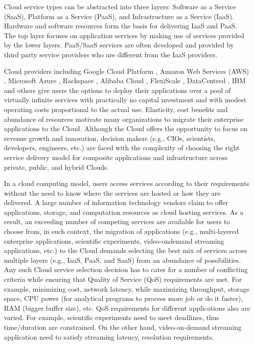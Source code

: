 Cloud service types can be abstracted into three layers: Software as
a Service (SaaS), Platform as a Service (PaaS), and
Infrastructure as a Service (IaaS). Hardware and software
resources form the basis for delivering IaaS and PaaS. The
top layer focuses on application services by making
use of services provided by the lower layers. PaaS/SaaS
services are often developed and provided by third party
service providers who are different from the IaaS providers.

Cloud providers including Google Cloud Platform \cite{google_cloud},
Amazon Web Services (AWS) \cite{aws}, Microsoft Azure \cite{azure}, 
Rackspace \cite{Rackspace},
Alibaba Cloud \cite{Alibaba}, FlexiScale \cite{FlexiScale}, 
DataCentred \cite{DataCentred}, IBM \cite{IBMSoftLayer} and others
give users the options to deploy their applications over a pool
of virtually infinite services with practically no capital
investment and with modest operating costs proportional to
the actual use. Elasticity, cost benefits and abundance of
resources motivate many organizations to migrate their
enterprise applications to the Cloud. Although the Cloud offers
the opportunity to focus on revenue growth and innovation,
decision makers (e.g., CIOs, scientists, developers,
engineers, etc.) are faced with the complexity of choosing
the right service delivery model for composite applications
and infrastructure across private, public, and hybrid Clouds.

In a cloud computing model, users access services according
to their requirements without the need to know where the
services are hosted or how they are delivered. 
A large number of information technology vendors claim to offer applications, storage,
and computation resources as cloud hosting services. As a
result, an exceeding number of competing services are available for
users to choose from, in such context, the migration of applications 
(e.g., multi-layered enterprise applications, scientific experiments, 
video-ondemand streaming applications, etc.) to the Cloud
demands selecting the best mix of services across multiple
layers (e.g., IaaS, PaaS, and SaaS) from an abundance of
possibilities. Any such Cloud service selection decision has
to cater for a number of conflicting criteria while ensuring that 
Quality of Service (QoS) requirements are met. For example, minimizing cost,
network latency, while maximizing throughput, storage space, CPU power (for analytical
programs to process more job or do it faster), RAM (bigger buffer size), etc.
QoS requirements for different applications also are varied. 
For example, scientific experiments need to meet deadlines, thus time/duration are constrained. 
On the other hand, video-on-demand streaming application need to satisfy streaming latency, resolution requirements.

